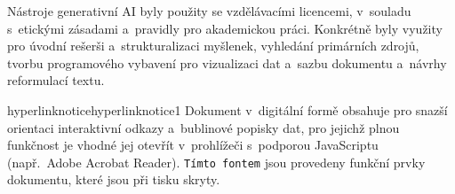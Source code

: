 Nástroje generativní AI byly použity se vzdělávacími licencemi, v~souladu s~etickými zásadami a~pravidly pro akademickou práci. Konkrétně byly využity pro úvodní rešerši a~strukturalizaci myšlenek, vyhledání primárních zdrojů, tvorbu programového vybavení pro vizualizaci dat a~sazbu dokumentu a~návrhy reformulací textu.\\

\begin{ocg}[printocg=never]{hyperlinknotice}{hyperlinknotice}{1}%
\noindent
Dokument v~digitální formě obsahuje pro snazší orientaci interaktivní odkazy a~bublinové popisky dat, pro jejichž plnou funkčnost je vhodné jej otevřít v~prohlížeči s~podporou JavaScriptu (např.~Adobe Acrobat Reader). \texttt{Tímto fontem} jsou provedeny funkční prvky dokumentu, které jsou při tisku skryty.\par
\end{ocg}